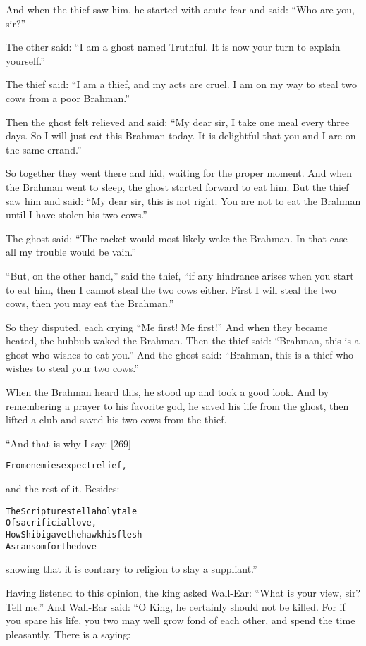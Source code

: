 \documentclass{article}
\renewenvironment{verbatim}{\begin{alltt}\normalfont\begin{centering}}{\end{centering}\end{alltt}}
\begin{document}
And when the thief saw him, he started with acute fear and said:
``Who are you, sir?''

The other said:
``I am a ghost named Truthful. It is now your turn to explain yourself.''

The thief said:
``I am a thief, and my acts are cruel. I am on my way to steal two cows from a poor Brahman.''

Then the ghost felt relieved and said:
``My dear sir, I take one meal every three days. So I will just eat this Brahman today. It is delightful that you and I are on the same errand.''

So together they went there and hid, waiting for the proper moment.
And when the Brahman went to sleep, the ghost started forward to
eat him. But the thief saw him and said:
``My dear sir, this is not right. You are not to eat the Brahman until I have stolen his two cows.''

The ghost said:
``The racket would most likely wake the Brahman. In that case all my trouble would be vain.''

``But, on the other hand,'' said the thief,
``if any hindrance arises when you start to eat him, then I cannot steal the two cows either. First I will steal the two cows, then you may eat the Brahman.''

So they disputed, each crying ``Me first! Me first!'' And when they
became heated, the hubbub waked the Brahman. Then the thief said:
``Brahman, this is a ghost who wishes to eat you.'' And the ghost
said:
``Brahman, this is a thief who wishes to steal your two cows.''

When the Brahman heard this, he stood up and took a good look. And
by remembering a prayer to his favorite god, he saved his life from
the ghost, then lifted a club and saved his two cows from the
thief.

“And that is why I say: [269]

\begin{verbatim}
From enemies expect relief,
\end{verbatim}
and the rest of it. Besides:

\begin{verbatim}
The Scriptures tell a holy tale
    Of sacrificial love,
How Shibi gave the hawk his flesh
    As ransom for the dove--
\end{verbatim}
showing that it is contrary to religion to slay a suppliant.”

Having listened to this opinion, the king asked Wall-Ear:
``What is your view, sir? Tell me.'' And Wall-Ear said: “O King, he
certainly should not be killed. For if you spare his life, you two
may well grow fond of each other, and spend the time pleasantly.
There is a saying:
\end{document}
